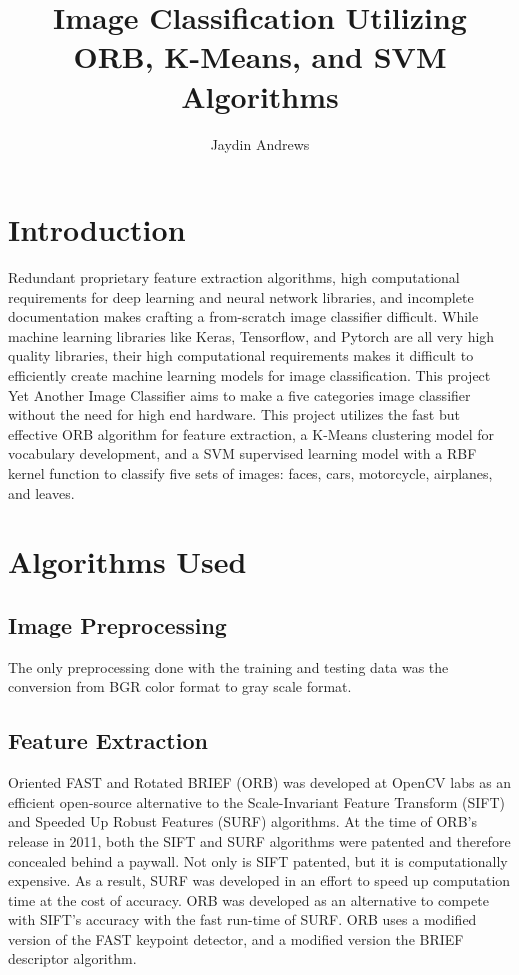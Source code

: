 \documentclass[stu,hidelinks,floatsintext,donotrepeattitle]{apa7}
\title{Image Classification Utilizing ORB, K-Means, and SVM Algorithms}
\author{Jaydin Andrews}
\begin{document}
\maketitle
\section{Introduction}
Redundant proprietary feature extraction algorithms, high computational requirements for deep learning and neural network libraries, and incomplete documentation makes crafting a from-scratch image classifier difficult. While machine learning libraries like Keras, Tensorflow, and Pytorch are all very high quality libraries, their high computational requirements makes it difficult to efficiently create machine learning models for image classification. This project Yet Another Image Classifier aims to make a five categories image classifier without the need for high end hardware. This project utilizes the fast but effective ORB algorithm for feature extraction, a K-Means clustering model for vocabulary development, and a SVM supervised learning model with a RBF kernel function to classify five sets of images: faces, cars, motorcycle, airplanes, and leaves.
\section{Algorithms Used}
\subsection{Image Preprocessing}
The only preprocessing done with the training and testing data was the conversion from BGR color format to gray scale format.
\subsection{Feature Extraction}
Oriented FAST and Rotated BRIEF (ORB) was developed at OpenCV labs as an efficient open-source alternative to the Scale-Invariant Feature Transform (SIFT) and Speeded Up Robust Features (SURF) algorithms. At the time of ORB's release in 2011, both the SIFT and SURF algorithms were patented and therefore concealed behind a paywall. Not only is SIFT patented, but it is computationally expensive. As a result, SURF was developed in an effort to speed up computation time at the cost of accuracy. ORB was developed as an alternative to compete with SIFT's accuracy with the fast run-time of SURF. ORB uses a modified version of the FAST keypoint detector, and a modified version the BRIEF descriptor algorithm.
\end{document}

